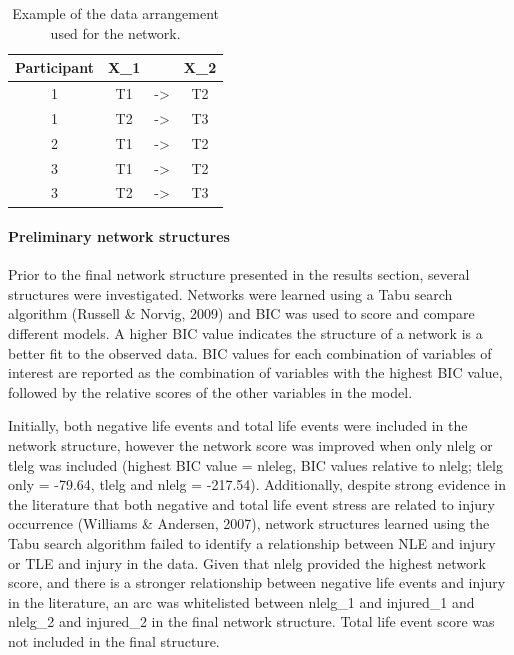 \documentclass[man,floatsintext]{apa6}
\let\oldparagraph\paragraph
\renewcommand{\paragraph}[1]{\oldparagraph{#1}\mbox{}}
\begin{document}
\begin{table}[tbp]

\begin{center}
\begin{threeparttable}

\caption{\label{tab:exampledata}Example of the data arrangement used for the network.}

\begin{tabular}{cccc}
\toprule
Participant & \multicolumn{1}{c}{X\_1} & \multicolumn{1}{c}{ } & \multicolumn{1}{c}{X\_2}\\
\midrule
1 & T1 & -> & T2\\
1 & T2 & -> & T3\\
2 & T1 & -> & T2\\
3 & T1 & -> & T2\\
3 & T2 & -> & T3\\
\bottomrule
\end{tabular}

\end{threeparttable}
\end{center}

\end{table}

\hypertarget{preliminary-network-structures}{%
\paragraph{Preliminary network structures}\label{preliminary-network-structures}}

Prior to the final network structure presented in the results section, several structures were investigated.
Networks were learned using a Tabu search algorithm (Russell \& Norvig, 2009) and BIC was used to score and compare different models.
A higher BIC value indicates the structure of a network is a better fit to the observed data.
BIC values for each combination of variables of interest are reported as the combination of variables with the highest BIC value, followed by the relative scores of the other variables in the model.

Initially, both negative life events and total life events were included in the network structure, however the network score was improved when only nlelg or tlelg was included (highest BIC value = nleleg, BIC values relative to nlelg; tlelg only = -79.64, tlelg and nlelg = -217.54).
Additionally, despite strong evidence in the literature that both negative and total life event stress are related to injury occurrence (Williams \& Andersen, 2007), network structures learned using the Tabu search algorithm failed to identify a relationship between NLE and injury or TLE and injury in the data.
Given that nlelg provided the highest network score, and there is a stronger relationship between negative life events and injury in the literature, an arc was whitelisted between nlelg\_1 and injured\_1 and nlelg\_2 and injured\_2 in the final network structure.
Total life event score was not included in the final structure.
\end{document}
